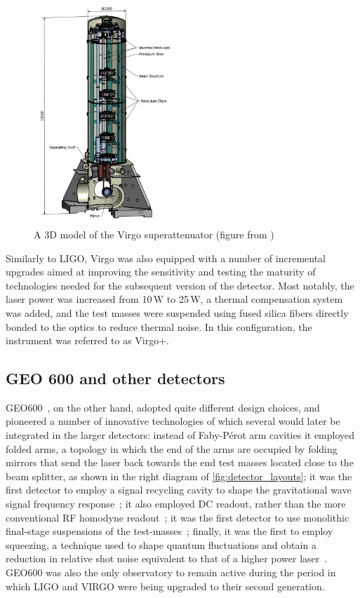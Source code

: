 \begin{figure}
	\centering
	\includegraphics[width=0.5\textwidth]{Figures/superattenuator.jpg}
	\caption{\label{fig:superattenuator}
		A 3D model of the Virgo superattenuator (figure from \cite{Accadia_2012})}
\end{figure}

Similarly to LIGO, Virgo was also equipped with a number of incremental upgrades aimed at improving the sensitivity and testing the maturity of technologies needed for the subsequent version of the detector.
Most notably, the laser power was increased from 10\,W to 25\,W, a thermal compensation system was added, and the test masses were suspended using fused silica fibers directly bonded to the optics to reduce thermal noise\cite{Lorenzini_2010}.
In this configuration, the instrument was referred to as Virgo+.

\subsection{GEO 600 and other detectors}
GEO600~\cite{Grote_2010}, on the other hand, adopted quite different design choices, and pioneered a number of innovative technologies of which several would later be integrated in the larger detectors:
instead of Faby-P\'{e}rot arm cavities it employed folded arms, a topology in which the end of the arms are occupied by folding mirrors that send the laser back towards the end test masses located close to the beam splitter, as shown in the right diagram of \autoref{fig:detector_layouts};
it was the first detector to employ a signal recycling cavity to shape the gravitational wave signal frequency response~\cite{Willke_2002};
it also employed DC readout, rather than the more conventional RF homodyne readout~\cite{DCreadout};
it was the first detector to use monolithic final-stage suspensions of the test-masses~\cite{Plissi_2000};
finally, it was the first to employ squeezing, a technique used to shape quantum fluctuations and obtain a reduction in relative shot noise equivalent to that of a higher power laser~\cite{Grote_2013}.
GEO600 was also the only observatory to remain active during the period in which LIGO and VIRGO were being upgraded to their second generation.

